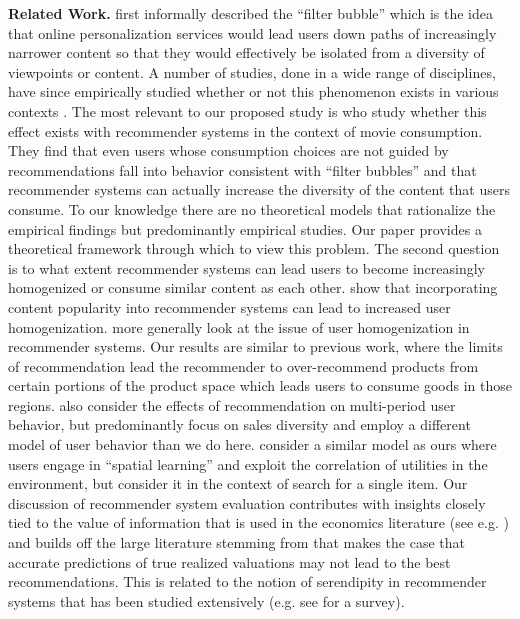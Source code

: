 \documentclass[sigconf, anonymous, review]{acmart}
\begin{document}
\textbf{Related Work.} 
\cite{pariser2011filter} first informally described the ``filter bubble'' which is the idea that online personalization services would lead users down paths of increasingly narrower content so that they would effectively be isolated from a diversity of viewpoints or content. A number of studies, done in a wide range of disciplines, have since empirically studied whether or not this phenomenon exists in various contexts \cite{flaxman2016filter,hosanagar2013will,moller2018blame,nguyen2014exploring}. The most relevant to our proposed study is \cite{nguyen2014exploring} who study whether this effect exists with recommender systems in the context of movie consumption. They find that even users whose consumption choices are not guided by recommendations fall into behavior consistent with ``filter bubbles'' and that recommender systems can actually increase the diversity of the content that users consume. To our knowledge there are no theoretical models that rationalize the empirical findings but predominantly empirical studies. Our paper provides a theoretical framework through which to view this problem.
The second question is to what extent recommender systems can lead users to become increasingly homogenized or consume similar content as each other. \cite{celam2008hits,treviranus2009value} show that incorporating content popularity into recommender systems can lead to increased user homogenization. \cite{chaney2018algorithmic} more generally look at the issue of user homogenization in recommender systems. Our results are similar to previous work, where the limits of recommendation lead the recommender to over-recommend products from certain portions of the product space which leads users to consume goods in those regions.
\cite{fleder2009blockbuster} also consider the effects of recommendation on multi-period user behavior, but predominantly focus on sales diversity and employ a different model of user behavior than we do here. \cite{hodgson2019horse} consider a similar model as ours where users engage in ``spatial learning'' and exploit the correlation of utilities in the environment, but consider it in the context of search for a single item.
Our discussion of recommender system evaluation contributes with insights closely tied to the value of information that is used in the economics literature (see e.g. \cite{bergemann2019information}) and builds off the large literature stemming from \cite{mcnee2006being} that makes the case that accurate predictions of true realized valuations may not lead to the best recommendations. This is related to the notion of serendipity in recommender systems that has been studied extensively (e.g. see \cite{kotkov2016survey} for a survey).
\end{document}
